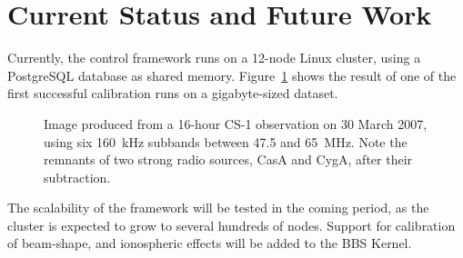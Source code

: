 \documentclass[11pt,twoside]{article}  %
\begin{document}

\section{Current Status and Future Work}
Currently, the control framework runs on a 12-node Linux cluster, using a
PostgreSQL database as shared memory. Figure~\ref{fig:O4b.4_first-results}
shows the result of one of the first successful calibration runs on a
gigabyte-sized dataset.

\begin{figure}[!ht]
\caption{Image produced from a 16-hour CS-1 observation on 30 March 2007,
using six 160~kHz subbands between 47.5 and 65~MHz. Note the remnants of two
strong radio sources, CasA and CygA, after their subtraction.}
\label{fig:O4b.4_first-results}
\end{figure}

The scalability of the framework will be tested in the coming period, as the
cluster is expected to grow to several hundreds of nodes. Support for
calibration of beam-shape, and ionospheric effects will be added to the BBS
Kernel.
\end{document}
